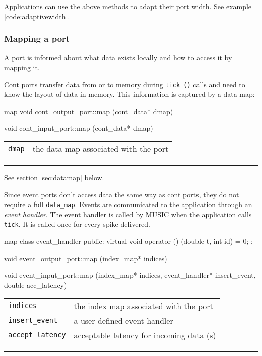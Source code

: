 \documentclass[a4paper]{report}
\makeatletter
\newenvironment{parameters}%
{\begin{tabular}{@{\hspace{2em}}lp{0.6\textwidth}}}%
{\end{tabular}\par\vspace{1mm}\par\hrule\par\vspace{5mm}}
\makeatother
\begin{document}
Applications can use the above methods to adapt their port width.  See
example \ref{code:adaptivewidth}.

\subsubsection{Mapping a port}

A port is informed about what data exists locally and how to access it
by mapping it.

Cont ports transfer data from or to memory during \lstinline|tick ()|
calls and need to know the layout of data in memory.  This information
is captured by a data map:

\begin{head}{map}
  void cont_output_port::map (cont_data* dmap)

  void cont_input_port::map (cont_data* dmap)
\end{head}
\begin{parameters}
  \lstinline|dmap| & the data map associated with the port \\
\end{parameters}

See section \ref{sec:datamap} below.

Since event ports don't access data the same way as cont ports, they
do not require a full \lstinline|data_map|.  Events are communicated
to the application through an \emph{event handler}.  The event handler is called by MUSIC when the application
calls \lstinline|tick|.  It is called once for every spike delivered.

\pagebreak
\begin{head}{map}
  class event_handler {
  public:
    virtual void operator () (double t, int id) = 0;
  };
  
  void event_output_port::map (index_map* indices)

  void event_input_port::map (index_map* indices,
                              event_handler* insert_event,
                              double acc_latency)
\end{head}
\begin{parameters}
  \lstinline|indices| & the index map associated with the port \\
  \lstinline|insert_event| & a user-defined event handler \\
  \lstinline|accept_latency| & acceptable latency for incoming data (s)
  \\
\end{parameters}
\end{document}
